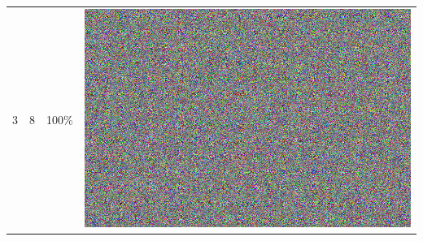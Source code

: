 \documentclass[times, utf8, seminar]{fer}
\begin{document}
\begin{center}
\begin{longtable}{|c|c|c|c|}
3 & 8 &100\% & \includegraphics[scale=0.3]{../benchmark_results/color_chart/3_components-8_bits.png} \\
\end{longtable}
\end{center}
\end{document}
